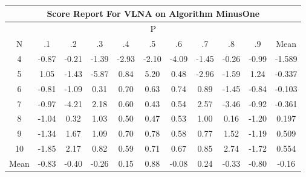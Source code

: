 \documentclass[11pt,a4paper]{report}
\begin{document}
\begin{longtable}{ | c || c | c | c | c | c | c | c | c | c || c |}
\hline
\multicolumn{11}{|c|}{ Score Report For VLNA on Algorithm MinusOne} \\
\hline
\multicolumn{11}{|c|}{ P } \\
\hline
N & .1 & .2 & .3 & .4 & .5 & .6 & .7 & .8 & .9 & Mean\\
 \hline
 \hline
 \endhead
  4 &  \cellcolor[HTML]{FFE7E7} -0.87 &  \cellcolor[HTML]{FFF7F7} -0.21 &  \cellcolor[HTML]{FFDFDF} -1.39 &  \cellcolor[HTML]{FFB7B7} -2.93 &  \cellcolor[HTML]{FFC7C7} -2.10 &  \cellcolor[HTML]{FF9797} -4.09 &  \cellcolor[HTML]{FFD7D7} -1.45 &  \cellcolor[HTML]{FFF7F7} -0.26 &  \cellcolor[HTML]{FFE7E7} -0.99 & -1.589 \\
  5 &  \cellcolor[HTML]{E7E7FF} 1.05 &  \cellcolor[HTML]{FFDFDF} -1.43 &  \cellcolor[HTML]{FF6868} -5.87 &  \cellcolor[HTML]{E7E7FF} 0.84 &  \cellcolor[HTML]{8080FF} 5.20 &  \cellcolor[HTML]{EFEFFF} 0.48 &  \cellcolor[HTML]{FFB7B7} -2.96 &  \cellcolor[HTML]{FFD7D7} -1.59 &  \cellcolor[HTML]{DFDFFF} 1.24 & -0.337 \\
  6 &  \cellcolor[HTML]{FFE7E7} -0.81 &  \cellcolor[HTML]{FFE7E7} -1.09 &  \cellcolor[HTML]{F7F7FF} 0.31 &  \cellcolor[HTML]{EFEFFF} 0.70 &  \cellcolor[HTML]{EFEFFF} 0.63 &  \cellcolor[HTML]{EFEFFF} 0.74 &  \cellcolor[HTML]{E7E7FF} 0.89 &  \cellcolor[HTML]{FFD7D7} -1.45 &  \cellcolor[HTML]{FFE7E7} -0.84 & -0.103 \\
  7 &  \cellcolor[HTML]{FFE7E7} -0.97 &  \cellcolor[HTML]{FF9797} -4.21 &  \cellcolor[HTML]{C7C7FF} 2.18 &  \cellcolor[HTML]{EFEFFF} 0.60 &  \cellcolor[HTML]{F7F7FF} 0.43 &  \cellcolor[HTML]{EFEFFF} 0.54 &  \cellcolor[HTML]{BFBFFF} 2.57 &  \cellcolor[HTML]{FFA7A7} -3.46 &  \cellcolor[HTML]{FFE7E7} -0.92 & -0.361 \\
  8 &  \cellcolor[HTML]{FFE7E7} -1.04 &  \cellcolor[HTML]{F7F7FF} 0.32 &  \cellcolor[HTML]{E7E7FF} 1.03 &  \cellcolor[HTML]{EFEFFF} 0.50 &  \cellcolor[HTML]{F7F7FF} 0.47 &  \cellcolor[HTML]{EFEFFF} 0.53 &  \cellcolor[HTML]{E7E7FF} 1.00 &  \cellcolor[HTML]{F7F7FF} 0.16 &  \cellcolor[HTML]{FFDFDF} -1.20 & 0.197 \\
  9 &  \cellcolor[HTML]{FFDFDF} -1.34 &  \cellcolor[HTML]{D7D7FF} 1.67 &  \cellcolor[HTML]{E7E7FF} 1.09 &  \cellcolor[HTML]{EFEFFF} 0.70 &  \cellcolor[HTML]{EFEFFF} 0.78 &  \cellcolor[HTML]{EFEFFF} 0.58 &  \cellcolor[HTML]{EFEFFF} 0.77 &  \cellcolor[HTML]{D7D7FF} 1.52 &  \cellcolor[HTML]{FFDFDF} -1.19 & 0.509 \\
  10 &  \cellcolor[HTML]{FFCFCF} -1.85 &  \cellcolor[HTML]{C7C7FF} 2.17 &  \cellcolor[HTML]{E7E7FF} 0.82 &  \cellcolor[HTML]{EFEFFF} 0.59 &  \cellcolor[HTML]{EFEFFF} 0.71 &  \cellcolor[HTML]{EFEFFF} 0.67 &  \cellcolor[HTML]{E7E7FF} 0.85 &  \cellcolor[HTML]{B7B7FF} 2.74 &  \cellcolor[HTML]{FFD7D7} -1.72 & 0.554 \\
 \hline
 \hline
Mean &  \cellcolor[HTML]{FFE7E7} -0.83 &  \cellcolor[HTML]{FFF7F7} -0.40 &  \cellcolor[HTML]{FFF7F7} -0.26 &  \cellcolor[HTML]{FFFFFF} 0.15 &  \cellcolor[HTML]{E7E7FF} 0.88 &  \cellcolor[HTML]{FFFFFF} -0.08 &  \cellcolor[HTML]{F7F7FF} 0.24 &  \cellcolor[HTML]{FFF7F7} -0.33 &  \cellcolor[HTML]{FFE7E7} -0.80 &  \cellcolor[HTML]{FFF7F7} -0.16
\end{longtable}
\end{document}

